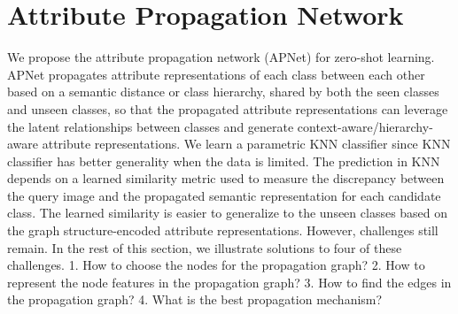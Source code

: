 \documentclass[letterpaper]{article} %
\def\vx{{\bm{x}}}
\begin{document}


\section{Attribute Propagation Network}
\label{model}

We propose the attribute propagation network (APNet) for zero-shot learning. APNet propagates attribute representations of each class between each other based on a semantic distance or class hierarchy, shared by both the seen classes and unseen classes, so that the propagated attribute representations can leverage the latent relationships between classes and generate context-aware/hierarchy-aware attribute representations. We learn a parametric KNN classifier since KNN classifier has better generality when the data is limited.
The prediction in KNN depends on a learned similarity metric used to measure the discrepancy between the query image and the propagated semantic representation for each candidate class.
The learned similarity is easier to generalize to the unseen classes based on the graph structure-encoded attribute representations.
However, challenges still remain. In the rest of this section, we illustrate solutions to four of these challenges.
1. How to choose the nodes for the propagation graph?
2. How to represent the node features in the propagation graph?
3. How to find the edges in the propagation graph?
4. What is the best propagation mechanism?


\end{document}
